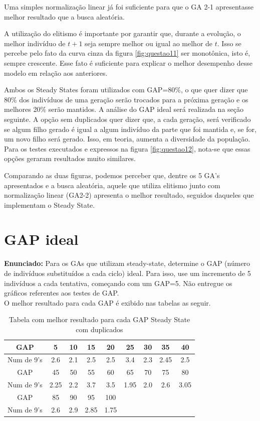 \documentclass[12pt]{article}
\begin{document}
Uma simples normalização linear já foi suficiente para que o GA 2-1 apresentasse melhor resultado que a busca aleatória.

A utilização do elitismo é importante por garantir que, durante a evolução, o melhor indivíduo de $t+1$ seja sempre melhor ou igual ao melhor de $t$. Isso se percebe pelo fato da curva cinza da figura \ref{fig:questao11} ser monotônica, isto é, sempre crescente. Esse fato é suficiente para explicar o melhor desempenho desse modelo em relação aos anteriores.

Ambos os Steady States foram utilizados com GAP=80\%, o que quer dizer que 80\% dos indivíduos de uma geração serão trocados para a próxima geração e os melhores 20\% serão mantidos. A análise do GAP ideal será realizada na seção seguinte. A opção sem duplicados quer dizer que, a cada geração, será verificado se algum filho gerado é igual a algum indivíduo da parte que foi mantida e, se for, um novo filho será gerado. Isso, em teoria, aumenta a diversidade da população. Para os testes executados e expressos na figura \ref{fig:questao12}, nota-se que essas opções geraram resultados muito similares.

Comparando as duas figuras, podemos perceber que, dentre os 5 GA's apresentados e a busca aleatória, aquele que utiliza elitismo junto com normalização linear (GA2-2) apresenta o melhor resultado, seguidos daqueles que implementam o Steady State.

\section{GAP ideal}
\textbf{Enunciado:} Para os GAs que utilizam steady-state, determine o GAP (número de indivíduos substituídos a cada ciclo) ideal. Para isso, use um incremento de 5 indivíduos a cada tentativa, começando com um GAP=5. Não entregue os gráficos referentes aos testes de GAP.\\

O melhor resultado para cada GAP é exibido nas tabelas as seguir.

\begin{table}[H]
	\centering
	\begin{tabular}{|c|c|c|c|c|c|c|c|c|}
		\hline
		GAP & 5 & 10 & 15 & 20 & 25 & 30 & 35 & 40 \\
		\hline
		Num de 9's &2.6  &2.1  &2.5  &2.5  &3.4  &2.3  &2.45  &2.5  \\
		\hline
		GAP & 45 & 50 & 55 & 60 & 65 & 70 & 75 & 80 \\
		\hline
		Num de 9's &2.25  &2.2  &3.7  &3.5  &1.95  &2.0  &2.6  &3.05  \\
		\hline
		GAP & 85 & 90 & 95 & 100 &  &  &  &  \\
		\hline
		Num de 9's &2.6  &2.9  &2.85  &1.75  &  &  &  &  \\
		\hline
	\end{tabular}
	\caption{Tabela com melhor resultado para cada GAP Steady State com duplicados}
\end{table}
\end{document}
